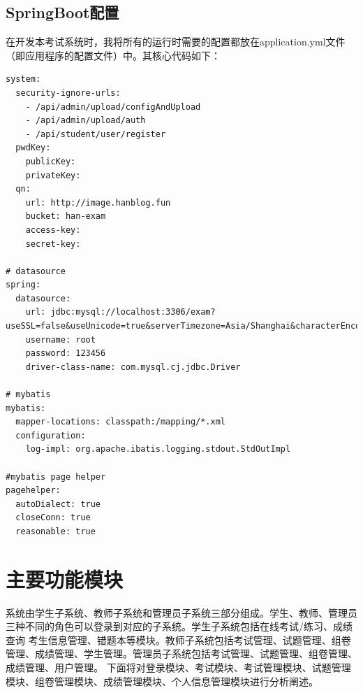 \subsection{SpringBoot配置}
在开发本考试系统时，我将所有的运行时需要的配置都放在application.yml文件（即应用程序的配置文件）中。其核心代码如下：
\begin{lstlisting}
system:
  security-ignore-urls:
    - /api/admin/upload/configAndUpload
    - /api/admin/upload/auth
    - /api/student/user/register
  pwdKey:
    publicKey: 
    privateKey: 
  qn:
    url: http://image.hanblog.fun
    bucket: han-exam
    access-key: 
    secret-key: 

# datasource
spring:
  datasource:
    url: jdbc:mysql://localhost:3306/exam?useSSL=false&useUnicode=true&serverTimezone=Asia/Shanghai&characterEncoding=utf8&zeroDateTimeBehavior=convertToNull&allowPublicKeyRetrieval=true&allowMultiQueries=true
    username: root
    password: 123456
    driver-class-name: com.mysql.cj.jdbc.Driver

# mybatis
mybatis:
  mapper-locations: classpath:/mapping/*.xml
  configuration:
    log-impl: org.apache.ibatis.logging.stdout.StdOutImpl

#mybatis page helper
pagehelper:
  autoDialect: true
  closeConn: true
  reasonable: true
\end{lstlisting}
\section{主要功能模块}
系统由学生子系统、教师子系统和管理员子系统三部分组成。学生、教师、管理员三种不同的角色可以登录到对应的子系统。学生子系统包括在线考试/练习、成绩查询
考生信息管理、错题本等模块。教师子系统包括考试管理、试题管理、组卷管理、成绩管理、学生管理。管理员子系统包括考试管理、试题管理、组卷管理、成绩管理、用户管理。
下面将对登录模块、考试模块、考试管理模块、试题管理模块、组卷管理模块、成绩管理模块、个人信息管理模块进行分析阐述。
